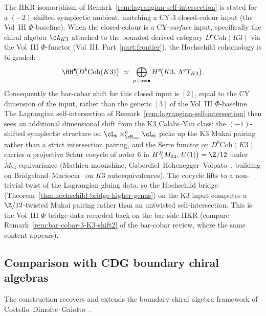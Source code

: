 \begin{remark}
\label{rem:hoch-CY2-K3-shift}
%
%
The HKR isomorphism of Remark~\ref{rem:lagrangian-self-intersection}
is stated for a $(-2)$-shifted symplectic ambient, matching a CY-$3$
closed-colour input (the Vol~III $\Phi$-baseline). When the closed
colour is a CY-\emph{surface} input, specifically the chiral algebra
$\cA_{K3}$ attached to the bounded derived category
$D^b\mathrm{Coh}(K3)$ via the Vol~III $\Phi$-functor
(Vol~III, Part~\ref{part:frontier}), the
Hochschild cohomology is bi-graded:
\[
\HH^\bullet\!\bigl(D^b\mathrm{Coh}(K3)\bigr)
\;\simeq\;
\bigoplus_{p+q=\bullet}
H^p\!\bigl(K3,\,\Lambda^q T_{K3}\bigr).
\]
Consequently the bar-cobar shift for this closed input is $[2]$,
equal to the CY dimension of the input, rather than the generic
$[3]$ of the Vol~III $\Phi$-baseline. The Lagrangian
self-intersection of Remark~\ref{rem:lagrangian-self-intersection}
then sees an additional dimensional shift from the K3
Calabi--Yau class: the $(-1)$-shifted symplectic structure on
$\cL_b\times^h_{\cM_{\mathrm{vac}}}\cL_b$ picks up the K3 Mukai
pairing rather than a strict intersection pairing, and the Serre
functor on $D^b\mathrm{Coh}(K3)$ carries a projective Schur cocycle
of order $6$ in $H^2\!\bigl(M_{24},\,U(1)\bigr)=\Z/12$ under
$\widetilde{M}_{24}$-equivariance (Mathieu moonshine,
Gaberdiel--Hohenegger--Volpato~\cite{GHV12}, building on
Bridgeland--Maciocia~\cite{BM01} on $K3$ autoequivalences). The
cocycle lifts to a non-trivial twist of the Lagrangian gluing data,
so the Hochschild bridge
(Theorem~\ref{thm:hochschild-bridge-higher-genus}) on the K3 input
computes a $\Z/12$-twisted Mukai pairing rather than an untwisted
self-intersection. This is the Vol~III $\Phi$-bridge data recorded
back on the bar-side HKR (compare
Remark~\ref{rem:bar-cobar-3-K3-shift2} of the bar-cobar
review, where the same content appears).
\end{remark}

\subsection{Comparison with CDG boundary chiral algebras}

The construction recovers and extends the boundary chiral algebra framework of Costello--Dimofte--Gaiotto~\cite{CDG20}.

